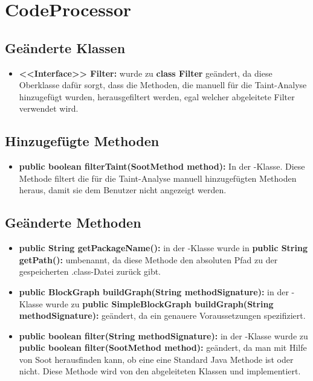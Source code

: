 \section{CodeProcessor}

\subsection{Geänderte Klassen}

\begin{itemize}
	\item \textbf{<<Interface>> Filter:} wurde zu \textbf{class Filter} geändert, da diese Oberklasse dafür sorgt, dass die Methoden, die manuell für die Taint-Analyse hinzugefügt wurden, herausgefiltert werden, egal welcher abgeleitete Filter verwendet wird.
\end{itemize}

\subsection{Hinzugefügte Methoden}

\begin{itemize}
	\item \textbf{public boolean filterTaint(SootMethod method):} In der -Klasse. Diese Methode filtert die für die Taint-Analyse manuell hinzugefügten Methoden heraus, damit sie dem Benutzer nicht angezeigt werden.
\end{itemize}

\subsection{Geänderte Methoden}

\begin{itemize}
	\item \textbf{public String getPackageName():} in der -Klasse wurde in \textbf{public String getPath():} umbenannt, da diese Methode den absoluten Pfad zu der gespeicherten .class-Datei zurück gibt.
	
	\item \textbf{public BlockGraph buildGraph(String methodSignature):} in der -Klasse wurde zu \textbf{public SimpleBlockGraph buildGraph(String methodSignature):} geändert, da ein  genauere Voraussetzungen spezifiziert.
	
	\item \textbf{public boolean filter(String methodSignature):} in der -Klasse wurde zu \textbf{public boolean filter(SootMethod method):} geändert, da man mit Hilfe von Soot herausfinden kann, ob eine  eine Standard Java Methode ist oder nicht. Diese Methode wird von den abgeleiteten Klassen  und  implementiert.
\end{itemize}

